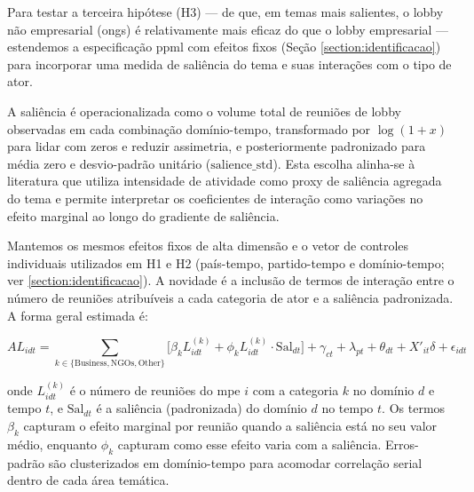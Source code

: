 Para testar a terceira hipótese (H3) — de que, em temas mais salientes, o lobby não empresarial (\acrshort{ong}s) é relativamente mais eficaz do que o lobby empresarial — estendemos a especificação \acrshort{ppml} com efeitos fixos (Seção \ref{section:identificacao}) para incorporar uma medida de saliência do tema e suas interações com o tipo de ator.

A saliência é operacionalizada como o volume total de reuniões de lobby observadas em cada combinação domínio-tempo, transformado por \(\log(1+x)\) para lidar com zeros e reduzir assimetria, e posteriormente padronizado para média zero e desvio-padrão unitário (\(\text{salience\_std}\)). Esta escolha alinha-se à literatura que utiliza intensidade de atividade como proxy de saliência agregada do tema e permite interpretar os coeficientes de interação como variações no efeito marginal ao longo do gradiente de saliência.

Mantemos os mesmos efeitos fixos de alta dimensão e o vetor de controles individuais utilizados em H1 e H2 (país-tempo, partido-tempo e domínio-tempo; ver \ref{section:identificacao}). A novidade é a inclusão de termos de interação entre o número de reuniões atribuíveis a cada categoria de ator e a saliência padronizada. A forma geral estimada é:

\begin{equation}
    \label{eq:modelo_h3}
    AL_{idt} = \sum_{k \in \{\text{Business},\text{NGOs},\text{Other}\}} \Big[ \beta_k L_{idt}^{(k)} + \phi_k L_{idt}^{(k)} \cdot \text{Sal}_{dt} \Big] + \gamma_{ct} + \lambda_{pt} + \theta_{dt} + X'_{it}\delta + \epsilon_{idt}
\end{equation}

onde \(L_{idt}^{(k)}\) é o número de reuniões do \acrshort{mpe} \(i\) com a categoria \(k\) no domínio \(d\) e tempo \(t\), e \(\text{Sal}_{dt}\) é a saliência (padronizada) do domínio \(d\) no tempo \(t\). Os termos \(\beta_k\) capturam o efeito marginal por reunião quando a saliência está no seu valor médio, enquanto \(\phi_k\) capturam como esse efeito varia com a saliência. Erros-padrão são clusterizados em domínio-tempo para acomodar correlação serial dentro de cada área temática.

